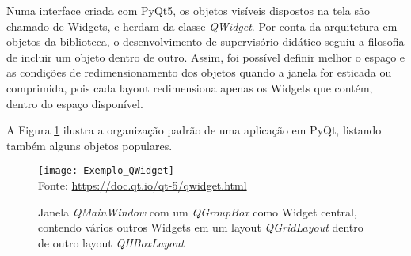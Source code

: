 Numa interface criada com PyQt5, os objetos visíveis dispostos na tela são chamado de Widgets, e herdam da classe \emph{QWidget}. Por conta da arquitetura em objetos da biblioteca, o desenvolvimento de supervisório didático seguiu a filosofia de incluir um objeto dentro de outro. Assim, foi possível definir melhor o espaço e as condições de redimensionamento dos objetos quando a janela for esticada ou comprimida, pois cada layout redimensiona apenas os Widgets que contém, dentro do espaço disponível.

A Figura \ref{img_exemplo_qwidget} ilustra a organização padrão de uma aplicação em PyQt, listando também alguns objetos populares.

\begin{figure}[hbt]
\centering
\caption{Janela \emph{QMainWindow} com um \emph{QGroupBox} como Widget central, contendo vários outros Widgets em um layout \emph{QGridLayout} dentro de outro layout \emph{QHBoxLayout}}
\texttt{[image: Exemplo\_QWidget]} \\
Fonte: \href{https://doc.qt.io/qt-5/qwidget.html}{https://doc.qt.io/qt-5/qwidget.html}
\label{img_exemplo_qwidget}
\end{figure}

